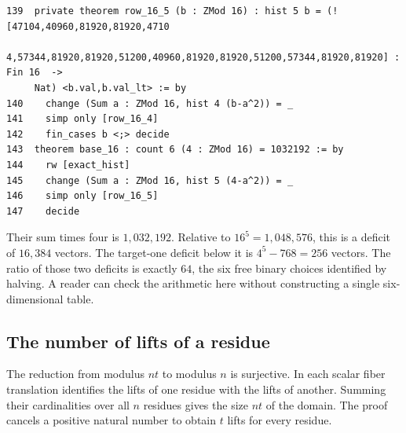 \documentclass[12pt,letterpaper]{article}
\begin{document}
\par
{\fontsize{9.2}{11.2}\selectfont\begin{verbatim}
139  private theorem row_16_5 (b : ZMod 16) : hist 5 b = (![47104,40960,81920,81920,4710
     4,57344,81920,81920,51200,40960,81920,81920,51200,57344,81920,81920] : Fin 16  ->
     Nat) <b.val,b.val_lt> := by
140    change (Sum a : ZMod 16, hist 4 (b-a^2)) = _
141    simp only [row_16_4]
142    fin_cases b <;> decide
143  theorem base_16 : count 6 (4 : ZMod 16) = 1032192 := by
144    rw [exact_hist]
145    change (Sum a : ZMod 16, hist 5 (4-a^2)) = _
146    simp only [row_16_5]
147    decide
\end{verbatim}}
Their sum times four is $1{,}032{,}192$. Relative to $16^5=1{,}048{,}576$, this is a deficit of $16{,}384$ vectors. The target-one deficit below it is $4^5-768=256$ vectors. The ratio of those two deficits is exactly $64$, the six free binary choices identified by halving. A reader can check the arithmetic here without constructing a single six-dimensional table.
\clearpage{}\subsection*{The number of lifts of a residue}\label{extract-FourLift6}
The reduction from modulus $nt$ to modulus $n$ is surjective. In each scalar fiber translation identifies the lifts of one residue with the lifts of another. Summing their cardinalities over all $n$ residues gives the size $nt$ of the domain. The proof cancels a positive natural number to obtain $t$ lifts for every residue.
\par
\end{document}
